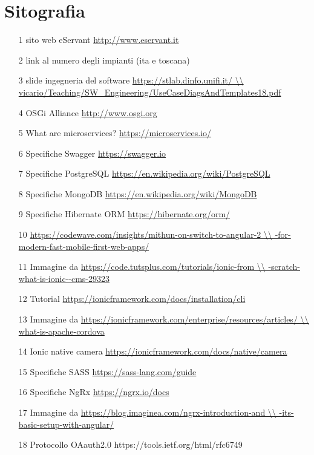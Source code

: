 \chapter{Sitografia}
\begin{itemize}
\item [1] sito web eServant \url{http://www.eservant.it}
\item [2] link al numero degli impianti (ita e toscana)
\item [3] slide ingegneria del software \url{https://stlab.dinfo.unifi.it/ \\
vicario/Teaching/SW_Engineering/UseCaseDiagsAndTemplates18.pdf}
\item [4] OSGi Alliance \url{http://www.osgi.org}
\item [5] What are microservices? \url{https://microservices.io/}
\item [6] Specifiche Swagger \url{https://swagger.io}
\item [7] Specifiche PostgreSQL \url{https://en.wikipedia.org/wiki/PostgreSQL}
\item [8] Specifiche MongoDB \url{https://en.wikipedia.org/wiki/MongoDB}
\item [9] Specifiche Hibernate ORM \url{https://hibernate.org/orm/}
\item [10] \url{https://codewave.com/insights/mithun-on-switch-to-angular-2 \\
-for-modern-fast-mobile-first-web-apps/}
\item [11] Immagine da \url{https://code.tutsplus.com/tutorials/ionic-from \\
-scratch-what-is-ionic--cms-29323}
\item [12] Tutorial \url{https://ionicframework.com/docs/installation/cli}
\item [13] Immagine da \url{https://ionicframework.com/enterprise/resources/articles/ \\
what-is-apache-cordova}
\item [14] Ionic native camera \url{https://ionicframework.com/docs/native/camera}
\item [15] Specifiche SASS \url{https://sass-lang.com/guide}
\item [16] Specifiche NgRx \url{https://ngrx.io/docs}
\item [17] Immagine da \url{https://blog.imaginea.com/ngrx-introduction-and \\
-its-basic-setup-with-angular/}
\item [18] Protocollo OAauth2.0 https://tools.ietf.org/html/rfc6749

\end{itemize}

